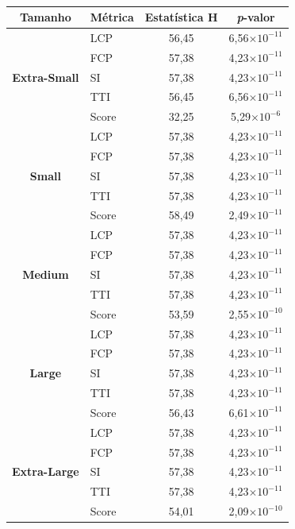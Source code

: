 \begin{table}[!ht]
\centering
\footnotesize
\caption{}
\begin{tabular}{|c|l|c|c|}
\hline
\textbf{Tamanho} & \textbf{Métrica} & \textbf{Estatística H} & \textbf{\textit{p}-valor} \\
\hline
\multirow{5}{*}{\textbf{Extra-Small}}
  & LCP       & 56,45 & 6,56$\times 10^{-11}$ \\ \cline{2-4}
  & FCP       & 57,38 & 4,23$\times 10^{-11}$ \\ \cline{2-4}
  & SI        & 57,38 & 4,23$\times 10^{-11}$ \\ \cline{2-4}
  & TTI       & 56,45 & 6,56$\times 10^{-11}$ \\ \cline{2-4}
  & Score     & 32,25 & 5,29$\times 10^{-6}$  \\ \hline
\multirow{5}{*}{\textbf{Small}}
  & LCP       & 57,38 & 4,23$\times 10^{-11}$ \\ \cline{2-4}
  & FCP       & 57,38 & 4,23$\times 10^{-11}$ \\ \cline{2-4}
  & SI        & 57,38 & 4,23$\times 10^{-11}$ \\ \cline{2-4}
  & TTI       & 57,38 & 4,23$\times 10^{-11}$ \\ \cline{2-4}
  & Score     & 58,49 & 2,49$\times 10^{-11}$ \\ \hline
\multirow{5}{*}{\textbf{Medium}}
  & LCP       & 57,38 & 4,23$\times 10^{-11}$ \\ \cline{2-4}
  & FCP       & 57,38 & 4,23$\times 10^{-11}$ \\ \cline{2-4}
  & SI        & 57,38 & 4,23$\times 10^{-11}$ \\ \cline{2-4}
  & TTI       & 57,38 & 4,23$\times 10^{-11}$ \\ \cline{2-4}
  & Score     & 53,59 & 2,55$\times 10^{-10}$ \\ \hline
\multirow{5}{*}{\textbf{Large}}
  & LCP       & 57,38 & 4,23$\times 10^{-11}$ \\ \cline{2-4}
  & FCP       & 57,38 & 4,23$\times 10^{-11}$ \\ \cline{2-4}
  & SI        & 57,38 & 4,23$\times 10^{-11}$ \\ \cline{2-4}
  & TTI       & 57,38 & 4,23$\times 10^{-11}$ \\ \cline{2-4}
  & Score     & 56,43 & 6,61$\times 10^{-11}$ \\ \hline
\multirow{5}{*}{\textbf{Extra-Large}}
  & LCP       & 57,38 & 4,23$\times 10^{-11}$ \\ \cline{2-4}
  & FCP       & 57,38 & 4,23$\times 10^{-11}$ \\ \cline{2-4}
  & SI        & 57,38 & 4,23$\times 10^{-11}$ \\ \cline{2-4}
  & TTI       & 57,38 & 4,23$\times 10^{-11}$ \\ \cline{2-4}
  & Score     & 54,01 & 2,09$\times 10^{-10}$ \\ \hline
\end{tabular}
\label{tab:kruskal-ext}
\end{table}
